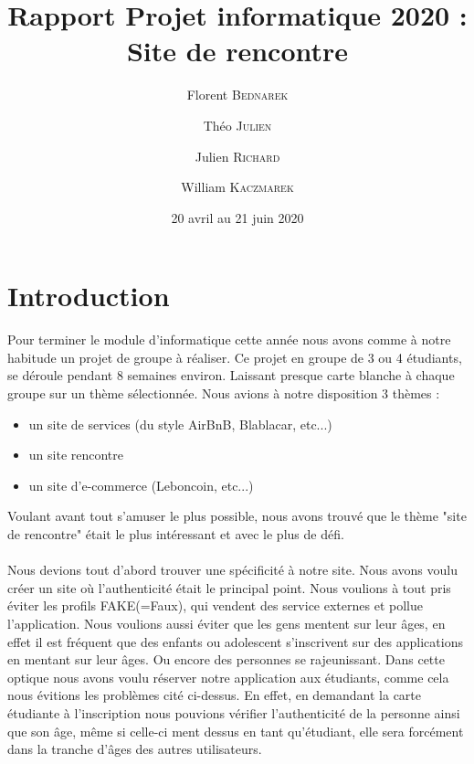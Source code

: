 \documentclass[12pt]{report}
\title{Rapport Projet informatique 2020 :\\Site de rencontre}
\author{Florent \textsc{Bednarek} \and Théo \textsc{Julien} \and Julien \textsc{Richard}\and William \textsc{Kaczmarek}}
\date{20  avril au 21 juin 2020}
\begin{document}
	\maketitle
	\tableofcontents
	\clearpage
\section{Introduction} 
	Pour terminer le module d'informatique cette année nous avons comme à notre habitude un projet de groupe à réaliser. Ce projet en groupe de 3 ou 4 étudiants, se déroule pendant 8 semaines environ. Laissant presque carte blanche à chaque groupe sur un thème sélectionnée. Nous avions à notre disposition 3 thèmes : \\
\begin{itemize}
	\item un site de services (du style AirBnB, Blablacar, etc...)
	\item un site rencontre
	\item un site d'e-commerce (Leboncoin, etc...)\\
\end{itemize}
Voulant avant tout s'amuser le plus possible, nous avons trouvé que le thème "site de rencontre" était le plus intéressant et avec le plus de défi.\\
\\
Nous devions tout d'abord trouver une spécificité à notre site. Nous avons voulu créer un site où l'authenticité était le principal point. Nous voulions à tout pris éviter les profils FAKE(=Faux), qui vendent des service externes et pollue l'application. Nous voulions aussi éviter que les gens mentent sur leur âges, en effet il est fréquent que des enfants ou adolescent s'inscrivent sur des applications en mentant sur leur âges. Ou encore des personnes se rajeunissant. Dans cette optique nous avons voulu réserver notre application aux étudiants, comme cela nous évitions les problèmes cité ci-dessus. En effet, en demandant la carte étudiante à l'inscription nous pouvions vérifier l'authenticité de la personne ainsi que son âge, même si celle-ci ment dessus en tant qu'étudiant, elle sera forcément dans la tranche d'âges des autres utilisateurs. \\
\\ 
\end{document}
